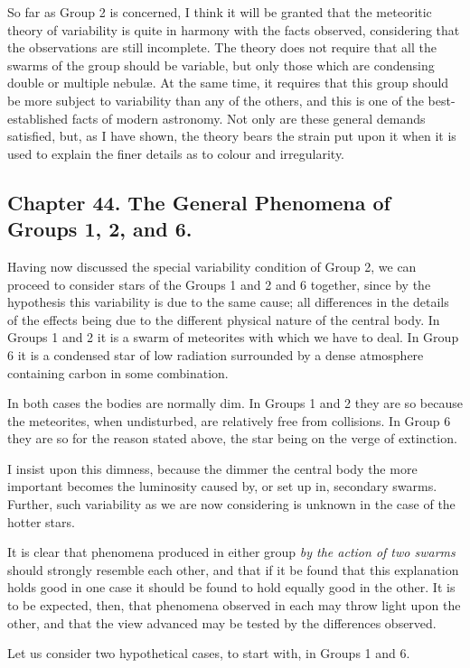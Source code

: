 \documentclass[a4paper, 12pt, oneside, polutonikogreek, english]{article}
\begin{document}
So far as Group 2 is concerned, I think it will be granted that the meteoritic theory of variability is quite in harmony with the facts observed, considering that the observations are still incomplete. The theory does not require that all the swarms of the group should be variable, but only those which are condensing double or multiple nebulæ. At the same time, it requires that this group should be more subject to variability than any of the others, and this is one of the best-established facts of modern astronomy. Not only are these general demands satisfied, but, as I have shown, the theory bears the strain put upon it when it is used to explain the finer details as to colour and irregularity.

\subsection{Chapter 44. The General Phenomena of Groups 1, 2, and 6.}

Having now discussed the special variability condition of Group 2, we can proceed to consider stars of the Groups 1 and 2 and 6 together, since by the hypothesis this variability is due to the same cause; all differences in the details of the effects being due to the different physical nature of the central body. In Groups 1 and 2 it is a swarm of meteorites with which we have to deal. In Group 6 it is a condensed star of low radiation surrounded by a dense atmosphere containing carbon in some combination.

In both cases the bodies are normally dim. In Groups 1 and 2 they are so because the meteorites, when undisturbed, are relatively free from collisions. In Group 6 they are so for the reason stated above, the star being on the verge of extinction.

I insist upon this dimness, because the dimmer the central body the more important becomes the luminosity caused by, or set up in, secondary swarms. Further, such variability as we are now considering is unknown in the case of the hotter stars.

It is clear that phenomena produced in either group \emph{by the action of two swarms} should strongly resemble each other, and that if it be found that this explanation holds good in one case it should be found to hold equally good in the other. It is to be expected, then, that phenomena observed in each may throw light upon the other, and that the view advanced may be tested by the differences observed.

Let us consider two hypothetical cases, to start with, in Groups 1 and 6.
\end{document}
